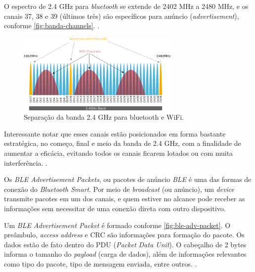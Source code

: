 O espectro de 2.4 GHz para \textit{bluetooth} se extende de 2402 MHz a 2480 MHz, e os canais 37, 38 e 39 (últimos três) são específicos para anúncio (\textit{advertisement}), conforme \autoref{fig:banda-channels}.  \cite{ble-packets}. 

\begin{figure}[htb]
	\caption{\label{fig:banda-channels}Separação da banda 2.4 GHz para bluetooth e WiFi.}
	\begin{center}
		\includegraphics[width=0.7\textwidth]{img/banda-2-4.png}
	\end{center}
\end{figure}

Interessante notar que esses canais estão posicionados em forma bastante estratégica, no começo, final e meio da banda de 2.4 GHz, com a finalidade de aumentar a eficácia, evitando todos os canais ficarem lotados ou com muita interferência. \cite{ble-packets}. 

Os \textit{BLE Advertisement Packets}, ou pacotes de anúncio \textit{BLE} é uma das formas de conexão do \textit{Bluetooth Smart}. Por meio de \textit{broadcast} (ou anúncio), um \textit{device} transmite pacotes em um dos canais, e quem estiver no alcance pode receber as informações sem necessitar de uma conexão direta com outro dispositivo.

Um \textit{BLE Advertisement Packet} é formado conforme \autoref{fig:ble-adv-packet}. O preâmbulo, \textit{access address} e CRC são informações para formação do pacote. Os dados estão de fato dentro do PDU (\textit{Packet Data Unit}). O cabeçalho de 2 bytes informa o tamanho do \textit{payload} (carga de dados), além de informações relevantes como tipo do pacote, tipo de mensagem enviada, entre outros. \cite{ble-packets}.

